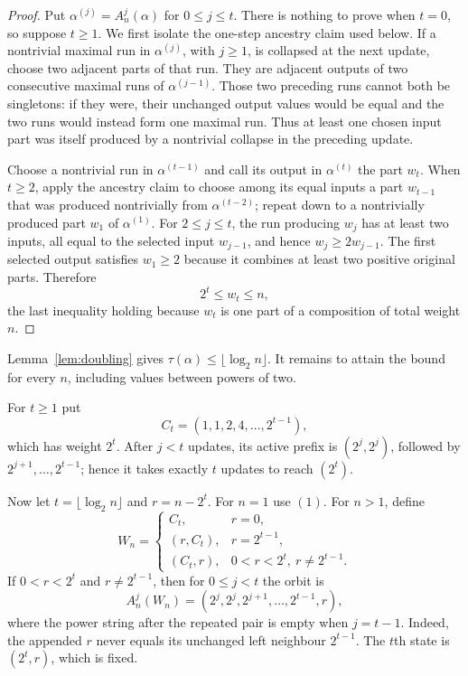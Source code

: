 \documentclass[a4paper,10pt]{amsart}
\theoremstyle{remark}
\begin{document}
\begin{proof}
Put $\alpha^{(j)}=A_n^j(\alpha)$ for $0\le j\le t$.  There is nothing to
prove when $t=0$, so suppose $t\ge1$.  We first isolate the one-step ancestry
claim used below.  If a nontrivial maximal run in $\alpha^{(j)}$, with
$j\ge1$, is collapsed at the next update, choose two adjacent parts of that
run.  They are adjacent outputs of two consecutive maximal runs of
$\alpha^{(j-1)}$.  Those two preceding runs cannot both be singletons: if
they were, their unchanged output values would be equal and the two runs
would instead form one maximal run.  Thus at least one chosen input part was
itself produced by a nontrivial collapse in the preceding update.

Choose a nontrivial run in $\alpha^{(t-1)}$ and call its output in
$\alpha^{(t)}$ the part $w_t$.  When $t\ge2$, apply the ancestry claim to
choose among its equal inputs a part $w_{t-1}$ that was produced
nontrivially from $\alpha^{(t-2)}$; repeat down to a nontrivially produced
part $w_1$ of $\alpha^{(1)}$.  For $2\le j\le t$, the run producing $w_j$
has at least two inputs, all equal to the selected input $w_{j-1}$, and hence
$w_j\ge2w_{j-1}$.  The first selected output satisfies $w_1\ge2$ because it
combines at least two positive original parts.  Therefore
\[
                     2^t\le w_t\le n,
\]
the last inequality holding because $w_t$ is one part of a composition of
total weight $n$.
\end{proof}

Lemma~\ref{lem:doubling} gives
$\tau(\alpha)\le\lfloor\log_2 n\rfloor$.  It remains to attain the bound for
every $n$, including values between powers of two.

For $t\ge1$ put
\begin{equation}\label{eq:cascade}
 C_t=(1,1,2,4,\ldots,2^{t-1}),
\end{equation}
which has weight $2^t$.  After $j<t$ updates, its active prefix is
$(2^j,2^j)$, followed by $2^{j+1},\ldots,2^{t-1}$; hence it takes exactly
$t$ updates to reach $(2^t)$.

Now let $t=\lfloor\log_2n\rfloor$ and $r=n-2^t$.  For $n=1$ use $(1)$.  For
$n>1$, define
\begin{equation}\label{eq:witness}
 W_n=
 \begin{cases}
 C_t,&r=0,\\
 (r,C_t),&r=2^{t-1},\\
 (C_t,r),&0<r<2^t,\ r\ne2^{t-1}.
 \end{cases}
\end{equation}
If $0<r<2^t$ and $r\ne2^{t-1}$, then for $0\le j<t$ the orbit is
\[
 A_n^j(W_n)=(2^j,2^j,2^{j+1},\ldots,2^{t-1},r),
\]
where the power string after the repeated pair is empty when $j=t-1$.
Indeed, the appended $r$ never equals its unchanged left neighbour
$2^{t-1}$.  The $t$th state is $(2^t,r)$, which is fixed.
\end{document}

